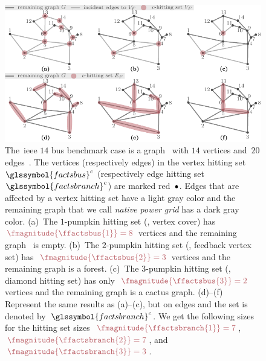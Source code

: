 \begin{figure}[t]
    \includegraphics[page=1]{factsplacement/figures/FeedbackSetsVertexBased.pdf}
    \caption[Different vertex and edge hitting sets for the~\gls{ieee} 14
    system.]{%
    The~\gls{ieee} $14$ bus benchmark case is a graph~ with
    $14$ vertices and~$20$ edges~\parencite{online:IEEEtestData}. The vertices
    (respectively edges) in the \textcolor{KITred70}{vertex hitting
    set~$\glssymbol{factsbus}^c$} (respectively \textcolor{KITred70}{edge
    hitting set~$\glssymbol{factsbranch}^c$}) are marked
    red~\textcolor{KITred70}{$\Large\bullet$}. Edges that are affected by a
    vertex hitting set have a \textcolor{KITblack50}{light gray color} and the
    remaining graph that we call \emph{native power grid}  has a
    \textcolor{KITblack70} {dark gray color}. (a)~The $1$-pumpkin hitting set
    (\ie, vertex cover) has~$\textcolor{KITred70}{\fmagnitude{\ffactsbus{1}} =
    8}$ vertices and the remaining graph~ is empty. (b)~The
    $2$-pumpkin hitting set (\ie, feedback vertex set)
    has~$\textcolor{KITred70}{\fmagnitude{\ffactsbus{2}} = 3}$ vertices and the
    remaining graph is a forest. (c)~The $3$-pumpkin hitting set (\ie, diamond
    hitting set) has only~$\textcolor{KITred70}{\fmagnitude{\ffactsbus{3}} = 2}$
    vertices and the remaining graph is a cactus graph. (d)--(f) Represent the
    same results as (a)--(c), but on edges and the set is denoted by~$
    \glssymbol{factsbranch}^c$. We get the
    following sizes for the hitting set
    sizes~$\textcolor{KITred70}{\fmagnitude{\ffactsbranch{1}} = 7}$,
    $\textcolor{KITred70}{\fmagnitude{\ffactsbranch{2}} = 7}$, and
    $\textcolor{KITred70}{\fmagnitude{\ffactsbranch{3}} = 3}$.
    }%
    \label{ch:facts:fig:feedback-sets-vertex-based}
\end{figure}
% 
